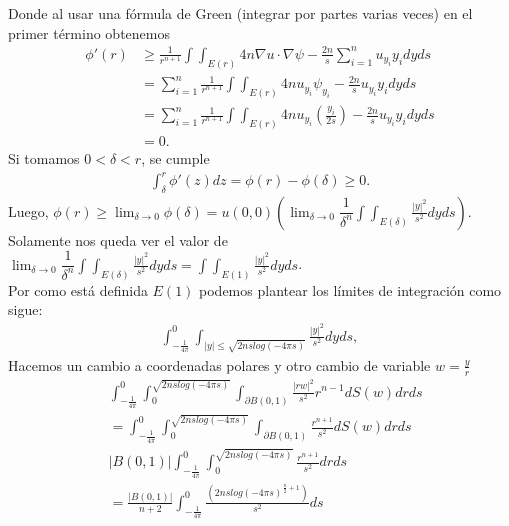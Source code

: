 \begin{homeworkProblem}
\begin{solucion}
    Donde al usar una fórmula de Green (integrar por partes varias veces) en el primer término obtenemos
    \begin{align*}
      \phi ' (r) &\geq \frac{1}{r^{n+1}} \int \int_{E(r)} 4n \nabla u \cdot \nabla \psi - \frac{2n}{s} \displaystyle \sum_{i=1}^{n} u_{y_{i}}y_{i} dyds\\ 
                 &=\displaystyle \sum_{i=1}^{n} \frac{1}{r^{n+1}} \int \int_{E(r)} 4n u_{y_{i}} \psi_{y_{i}} - \frac{2n}{s} u_{y_{i}}y_{i} dyds\\ 
                 &= \displaystyle \sum_{i=1}^{n} \frac{1}{r^{n+1}} \int \int_{E(r)} 4n u_{y_{i}} \left( \frac{y_{i}}{2s}\right) - \frac{2n}{s} u_{y_{i}}y_{i} dyds\\ 
                 &=0.
    \end{align*} 
    Si tomamos $0< \delta < r$, se cumple
    \begin{align*}
      \int_{\delta}^{r} \phi '(z) dz = \phi(r) - \phi(\delta) \geq 0.
    \end{align*}
    Luego, $\phi(r) \geq \lim_{\delta \rightarrow 0} \phi(\delta) = u(0,0) \left(\lim_{\delta \rightarrow 0} \dfrac{1}{\delta ^{n}} \displaystyle \int \displaystyle \int_{E(\delta)} \frac{|y|^{2}}{s^{2}} dyds\right)$.\\ 
    Solamente nos queda ver el valor de $\lim_{\delta \rightarrow 0} \dfrac{1}{\delta ^{n}} \displaystyle \int \displaystyle \int_{E(\delta)} \frac{|y|^{2}}{s^{2}} dyds = \displaystyle \int \displaystyle \int_{E(1)} \frac{|y|^{2}}{s^{2}} dyds$.\\ 
    Por como está definida $E(1)$ podemos plantear los límites de integración como sigue:
    \begin{align*}
      \int_{-\frac{1}{4\pi}}^{0} \int_{|y| \leq \sqrt{2nslog(-4\pi s)}} \frac{|y|^{2}}{s^{2}} dyds,
    \end{align*}
    Hacemos un cambio a coordenadas polares y otro cambio de variable $w = \frac{y}{r}$
    \begin{align*}
      &\int_{-\frac{1}{4\pi}}^{0} \int_{0}^{\sqrt{2nslog(-4\pi s)}} \int_{\partial B(0,1)} \frac{|rw|^{2}}{s^{2}} r^{n-1} dS(w)drds\\
      &= \int_{-\frac{1}{4\pi}}^{0} \int_{0}^{\sqrt{2nslog(-4\pi s)}} \int_{\partial B(0,1)} \frac{r^{n+1}}{s^{2}} dS(w)drds\\
      &|B(0,1)| \int_{-\frac{1}{4\pi}}^{0} \int_{0}^{\sqrt{2nslog(-4\pi s)}} \frac{r^{n+1}}{s^{2}} drds\\ 
      &= \frac{|B(0,1)|}{n+2} \int_{-\frac{1}{4\pi}}^{0} \frac{(2nslog(-4\pi s)^{\frac{n}{2} + 1})}{s^{2}} ds\\

\end{align*}
\end{solucion}
\end{homeworkProblem}
